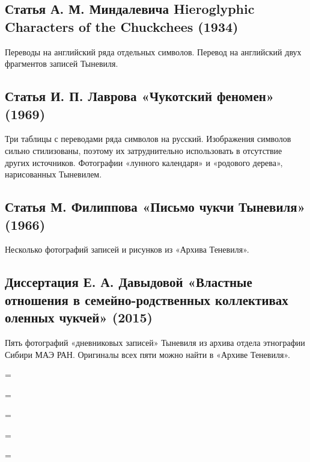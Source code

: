 \documentclass{article}
\newcounter{glyph}
\def\allchars{}
\begin{document}
\subsection{Статья А. М. Миндалевича Hieroglyphic Characters of the Chuckchees (1934) }

Переводы на английский ряда отдельных символов. Перевод на английский двух фрагментов записей Тыневиля.

\subsection{Статья И. П. Лаврова «Чукотский феномен» (1969)}

Три таблицы с переводами ряда символов на русский. Изображения символов сильно стилизованы, поэтому их затруднительно использовать в отсутствие других источников. Фотографии «лунного календаря» и «родового дерева», нарисованных Тыневилем.

\subsection{Статья М. Филиппова «Письмо чукчи Тыневиля» (1966)}

Несколько фотографий записей и рисунков из «Архива Теневиля». 

\subsection{Диссертация Е. А. Давыдовой «Властные отношения в семейно-родственных коллективах оленных чукчей» (2015)}

Пять фотографий «дневниковых записей» Тыневиля из архива отдела этнографии Сибири МАЭ РАН. Оригиналы всех пяти можно найти в «Архиве Теневиля». 

\cite[360]{davydova2015a} = 

\cite[361]{davydova2015a} = 

\cite[362]{davydova2015a} = 

\cite[363]{davydova2015a} = 

\cite[364]{davydova2015a} =  

\printbibliography

\end{document}
